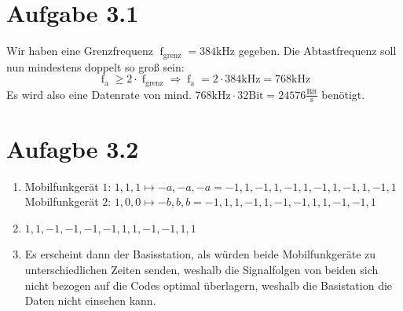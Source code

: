 \documentclass[12pt, a4paper]{article}
\begin{document}
\begin{center}\end{center}



\section*{Aufgabe 3.1}
Wir haben eine Grenzfrequenz $\operatorname{f}_{\text{grenz}} = 384 \text{kHz}$ gegeben. Die Abtastfrequenz soll nun mindestens doppelt so groß sein: 
$$\operatorname{f}_{\text{a}} \geq 2 \cdot \operatorname{f}_{\text{grenz}} \Rightarrow \operatorname{f}_{\text{a}} = 2 \cdot 384 \text{kHz} = 768 \text{kHz}$$
Es wird also eine Datenrate von mind. $768 \text{kHz} \cdot 32 \text{Bit} = 24576 \frac{\text{Bit}}{\text{s}}$ benötigt.



\section*{Aufagbe 3.2}
\begin{enumerate}[label=\alph*)]
	\item	Mobilfunkgerät $1$: $1,1,1 \mapsto -a,-a,-a = -1,1,-1,1, -1,1,-1,1, -1,1,-1,1$\\
			Mobilfunkgerät $2$: $1,0,0 \mapsto -b,b,b = -1,1,1,-1, 1,-1,-1,1, 1,-1,-1,1$
	
	\item	$1,1,-1,-1, -1,-1,1,1, -1,-1,1,1$
	
	\item	Es erscheint dann der Basisstation, als würden beide Mobilfunkgeräte zu unterschiedlichen Zeiten senden, weshalb die Signalfolgen von beiden sich nicht bezogen auf die Codes optimal überlagern, weshalb die Basistation die Daten nicht einsehen kann.
\end{enumerate}
\end{document}
